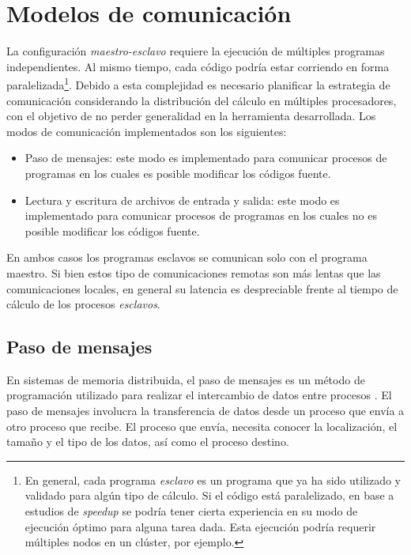\section{Modelos de comunicación}
\label{2:comunicacion}

La configuración \textit{maestro-esclavo} requiere la ejecución de múltiples programas independientes.
Al mismo tiempo, cada código podría estar corriendo en forma paralelizada\footnote{
En general, cada programa \textit{esclavo} es un programa que ya ha sido utilizado y validado para algún tipo de cálculo.
Si el código está paralelizado, en base a estudios de \textit{speedup} se podría tener cierta experiencia en su modo de ejecución óptimo para alguna tarea dada.
Esta ejecución podría requerir múltiples nodos en un clúster, por ejemplo.
}.
Debido a esta complejidad es necesario planificar la estrategia de comunicación considerando la distribución del cálculo en múltiples procesadores,
con el objetivo de no perder generalidad en la herramienta desarrollada.
Los modos de comunicación implementados son los siguientes:
\begin{itemize}
\item Paso de mensajes: este modo es implementado para comunicar procesos de programas en los cuales es posible modificar los códigos fuente.
\item Lectura y escritura de archivos de entrada y salida: este modo es implementado para comunicar procesos de programas en los cuales no es posible modificar los códigos fuente.
\end{itemize}

En ambos casos los programas esclavos se comunican solo con el programa maestro.
Si bien estos tipo de comunicaciones remotas son más lentas que las
comunicaciones locales, en general su latencia es despreciable frente al tiempo de cálculo de los procesos \textit{esclavos}.

\subsection*{Paso de mensajes}
\label{2:mpi}

En sistemas de memoria distribuida, el paso de mensajes es un método de
programación utilizado para realizar el intercambio de datos entre
procesos \cite{comunicacion}. 
El paso de mensajes involucra la transferencia de datos desde un proceso
que envía a otro proceso que recibe. 
El proceso que envía,
necesita conocer la localización, el tamaño y el tipo de los datos, así como el
proceso destino.

